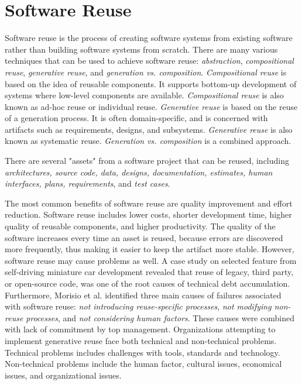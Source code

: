 
\section{Software Reuse}
\label{sec:reuse}
Software reuse is the process of creating software systems from existing software rather than building software systems from scratch\cite{krueger1992software,frakes1996software}. There are many various techniques that can be used to achieve software reuse: \textit{abstraction}, \textit{compositional reuse}, \textit{generative reuse}, and \textit{generation vs. composition}\cite{sametinger1997software}. \textit{Compositional reuse} is based on the idea of reusable components. It supports bottom-up development of systems where low-level components are available. \textit{Compositional reuse} is also known as ad-hoc reuse or individual reuse. \textit{Generative reuse} is based on the reuse of a generation process. It is often domain-specific, and is concerned with artifacts such as requirements, designs, and subsystems\cite{frakes1994systematic}. \textit{Generative reuse} is also known as systematic reuse\cite{frakes1994systematic}. \textit{Generation vs. composition} is a combined approach. 

There are several "assets" from a software project that can be reused, including \textit{architectures, source code, data, designs, documentation, estimates, human interfaces, plans, requirements}, and \textit{test cases}\cite{frakes1996software}.

The most common benefits of software reuse are quality improvement and effort reduction. Software reuse includes lower costs, shorter development time, higher quality of reusable components, and higher productivity\cite{Slyngstad:2006:ESD:1159733.1159770,lim1994effects}. The quality of the software increases every time an asset is reused, because errors are discovered more frequently, thus making it easier to keep the artifact more stable\cite{sametinger1997software}. However, software reuse may cause problems as well. A case study on selected feature from self-driving miniature car development revealed that reuse of legacy, third party, or open-source code, was one of the root causes of technical debt accumulation\cite{6974884}. Furthermore, Morisio et al.\cite{995420} identified three main causes of failures associated with software reuse: \textit{not introducing reuse-specific processes}, \textit{not modifying non-reuse processes}, and \textit{not considering human factors}. These causes were combined with lack of commitment by top management. Organizations attempting to implement generative reuse face both technical and non-technical problems\cite{frakes1994success}. Technical problems includes challenges with tools, standards and technology. Non-technical problems include the human factor, cultural issues, economical issues, and organizational issues. 




